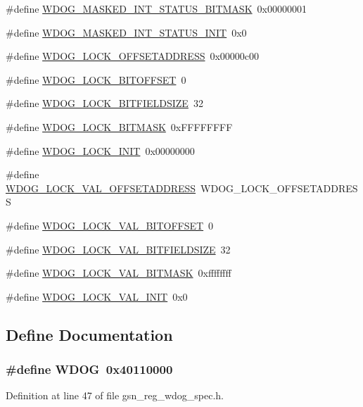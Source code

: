 \begin{DoxyCompactItemize}
\#define \hyperlink{a00577_a2fc95fe9e4a0a0bed0ba5fae9f7309f1}{WDOG\_\-MASKED\_\-INT\_\-STATUS\_\-BITMASK}~0x00000001
\item 
\#define \hyperlink{a00577_ab4a4e4fb309101a79630087c4fdb3c9e}{WDOG\_\-MASKED\_\-INT\_\-STATUS\_\-INIT}~0x0
\item 
\#define \hyperlink{a00577_addf24c6cd3010e36cc2f6e07fbdf6c37}{WDOG\_\-LOCK\_\-OFFSETADDRESS}~0x00000c00
\item 
\#define \hyperlink{a00577_aaa012f010102c750c84ec6deed629f76}{WDOG\_\-LOCK\_\-BITOFFSET}~0
\item 
\#define \hyperlink{a00577_ad2d78e2c8ba5209b19df49da4c5b4b67}{WDOG\_\-LOCK\_\-BITFIELDSIZE}~32
\item 
\#define \hyperlink{a00577_a6e1dab22db0cdd64db7267f7fe4ba9ef}{WDOG\_\-LOCK\_\-BITMASK}~0xFFFFFFFF
\item 
\#define \hyperlink{a00577_ac24786088a3d018ef910eafc93e87eea}{WDOG\_\-LOCK\_\-INIT}~0x00000000
\item 
\#define \hyperlink{a00577_a7e737ffb4aaed49a90c108b3ec2e1835}{WDOG\_\-LOCK\_\-VAL\_\-OFFSETADDRESS}~WDOG\_\-LOCK\_\-OFFSETADDRESS
\item 
\#define \hyperlink{a00577_ad5de32ea7afa75535ee3f1a162765b1d}{WDOG\_\-LOCK\_\-VAL\_\-BITOFFSET}~0
\item 
\#define \hyperlink{a00577_aa3e8d10479518ca42fe764b29568f061}{WDOG\_\-LOCK\_\-VAL\_\-BITFIELDSIZE}~32
\item 
\#define \hyperlink{a00577_a57c0d0795acbc95a67b4fd9b7d4459a9}{WDOG\_\-LOCK\_\-VAL\_\-BITMASK}~0xffffffff
\item 
\#define \hyperlink{a00577_acd9a6583a7ebdf65df81623dbac013fc}{WDOG\_\-LOCK\_\-VAL\_\-INIT}~0x0
\end{DoxyCompactItemize}


\subsection{Define Documentation}
\hypertarget{a00577_ab938901a5fa5443253fc293ebd0399e3}{
\subsubsection[{WDOG}]{\setlength{\rightskip}{0pt plus 5cm}\#define WDOG~0x40110000}}
\label{a00577_ab938901a5fa5443253fc293ebd0399e3}


Definition at line 47 of file gsn\_\-reg\_\-wdog\_\-spec.h.

